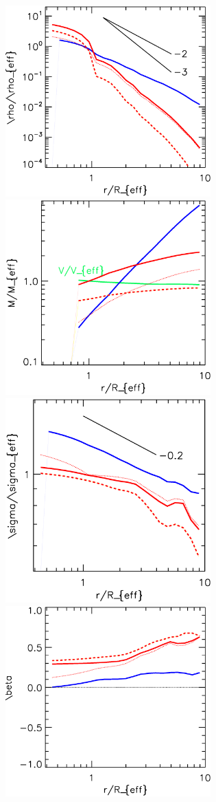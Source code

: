 \documentclass[a4paper,usenatbib,usegraphicx,twocolumn]{report}
\begin{document}
\twocolumn
\begin{figure}
\centering \includegraphics[width=79mm]{rho3dstack.eps}
\centering \includegraphics[width=79mm]{m3dstack.eps}
\centering \includegraphics[width=79mm]{sigma3dstack.eps}
\centering \includegraphics[width=79mm]{beta3dstack.eps}
\end{figure}
\end{document}
